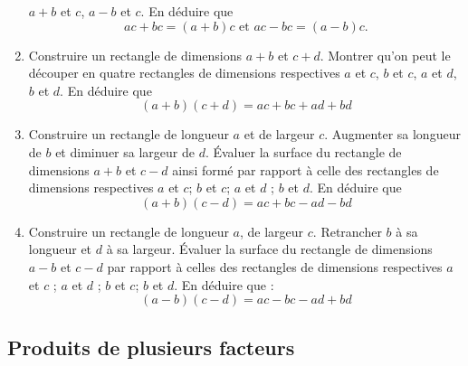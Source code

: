 \documentclass[12 pt]{extarticle}
\theoremstyle{plain}
\begin{document}
\begin{enumerate}
$a+b$ et $c$, $a-b$ et $c$. En déduire que 
\[ ac + bc = (a + b)c\text{    et    } ac - bc = (a - b) c.\]
\item Construire un rectangle de dimensions $a + b$ 
et $c + d$. Montrer qu'on peut le découper en quatre
rectangles de dimensions respectives $a$ et $c$, 
$b$ et $c$, $a$ et $d$, $b$ et $d$. En déduire que 
\[ (a + b)(c + d) = ac + bc + ad + bd\]
\item Construire un rectangle de longueur $a$ et de
largeur $c$. Augmenter sa longueur de $b$ et 
diminuer sa largeur de $d$. Évaluer la surface du 
rectangle de dimensions $a + b$ et $c - d$ ainsi 
formé par rapport à celle des rectangles de dimensions
respectives $a$ et $c$; $b$ et $c$; $a$ et $d$ ; $b$
et $d$. En déduire que 
\[ (a + b)(c - d) = ac + bc - ad - bd\]
\item Construire un rectangle de longueur $a$, 
de largeur $c$. Retrancher $b$ à sa longueur et 
$d$ à sa largeur. Évaluer la surface du rectangle 
de dimensions $a - b$ et $c - d$ par rapport à 
celles des rectangles de dimensions respectives 
$a$ et $c$ ; $a$ et $d$ ; $b$ et $c$; $b$ et $d$. 
En déduire que : 
\[ (a - b)(c - d) = ac - bc - ad + bd\]

 \end{enumerate}
 \subsection{Produits de plusieurs facteurs}
 
\end{document}
